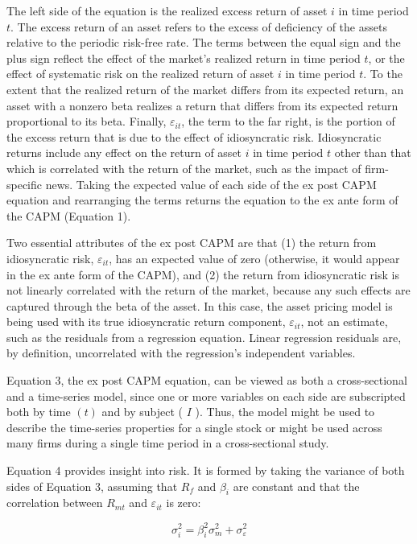 \documentclass[11pt]{article}
\begin{document}
The left side of the equation is the realized excess return of asset $i$ in time period $t$. The excess return of an asset refers to the excess of deficiency of the assets relative to the periodic risk-free rate. The terms between the equal sign and the plus sign reflect the effect of the market's realized return in time period $t$, or the effect of systematic risk on the realized return of asset $i$ in time period $t$. To the extent that the realized return of the market differs from its expected return, an asset with a nonzero beta realizes a return that differs from its expected return proportional to its beta. Finally, $\varepsilon_{i t}$, the term to the far right, is the portion of the excess return that is due to the effect of idiosyncratic risk. Idiosyncratic returns include any effect on the return of asset $i$ in time period $t$ other than that which is correlated with the return of the market, such as the impact of firm-specific news. Taking the expected value of each side of the ex post CAPM equation and rearranging the terms returns the equation to the ex ante form of the CAPM (Equation 1).

Two essential attributes of the ex post CAPM are that (1) the return from idiosyncratic risk, $\varepsilon_{i t}$, has an expected value of zero (otherwise, it would appear in the ex ante form of the CAPM), and (2) the return from idiosyncratic risk is not linearly correlated with the return of the market, because any such effects are captured through the beta of the asset. In this case, the asset pricing model is being used with its true idiosyncratic return component, $\varepsilon_{i t}$, not an estimate, such as the residuals from a regression equation. Linear regression residuals are, by definition, uncorrelated with the regression's independent variables.

Equation 3, the ex post CAPM equation, can be viewed as both a cross-sectional and a time-series model, since one or more variables on each side are subscripted both by time $(t)$ and by subject ( $I$ ). Thus, the model might be used to describe the time-series properties for a single stock or might be used across many firms during a single time period in a cross-sectional study.

Equation 4 provides insight into risk. It is formed by taking the variance of both sides of Equation 3, assuming that $R_{f}$ and $\beta_{i}$ are constant and that the correlation between $R_{m t}$ and $\varepsilon_{i t}$ is zero:


\begin{equation*}
\sigma_{i}^{2}=\beta_{i}^{2} \sigma_{m}^{2}+\sigma_{\varepsilon}^{2} \tag{4}
\end{equation*}
\end{document}
